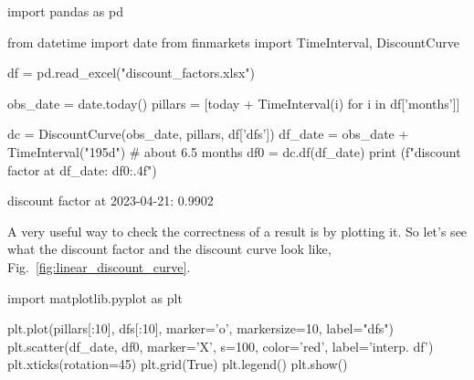 \begin{ipython}
import pandas as pd

from datetime import date
from finmarkets import TimeInterval, DiscountCurve

df = pd.read_excel("discount_factors.xlsx")

obs_date = date.today()
pillars = [today + TimeInterval(i) for i in df['months']]

dc = DiscountCurve(obs_date, pillars, df['dfs'])
df_date = obs_date + TimeInterval("195d") # about 6.5 months
df0 = dc.df(df_date)
print (f"discount factor at {df_date}: {df0:.4f}")
\end{ipython}
\begin{ioutput}
discount factor at 2023-04-21: 0.9902
\end{ioutput}

A very useful way to check the correctness of a result is by plotting it. So let's see what the discount factor and the discount curve look like, Fig.~\ref{fig:linear_discount_curve}.

\begin{ipython}
import matplotlib.pyplot as plt

plt.plot(pillars[:10], dfs[:10], marker='o', markersize=10, 
         label="dfs")
plt.scatter(df_date, df0, marker='X', s=100, color='red', 
            label='interp. df')
plt.xticks(rotation=45)
plt.grid(True)
plt.legend()
plt.show()
\end{ipython}


